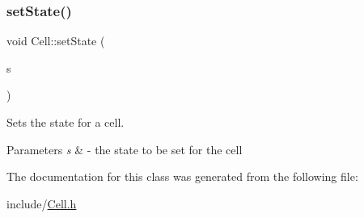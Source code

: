\subsubsection{\texorpdfstring{set\+State()}{setState()}}
{\footnotesize\ttfamily void Cell\+::set\+State (\begin{DoxyParamCaption}\item[{\hyperlink{_cell_types_8h_ad5292c4e76abc657b113de5594268aa9}{Cell\+State}}]{s }\end{DoxyParamCaption})}



Sets the state for a cell. 


\begin{DoxyParams}{Parameters}
{\em s} & -\/ the state to be set for the cell \\
\hline
\end{DoxyParams}


The documentation for this class was generated from the following file\+:\begin{DoxyCompactItemize}
\item 
include/\hyperlink{_cell_8h}{Cell.\+h}\end{DoxyCompactItemize}
